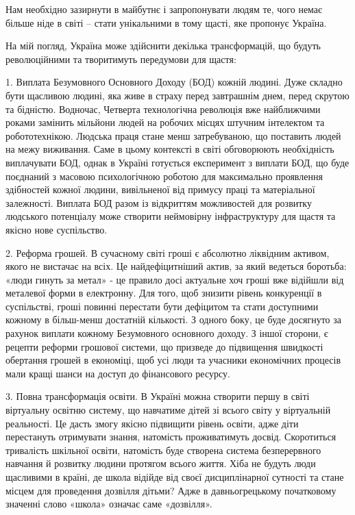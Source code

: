 Нам необхідно зазирнути в майбутнє і запропонувати людям те, чого немає більше
ніде в світі – стати унікальними в тому щасті, яке пропонує Україна. 

На мій погляд, Україна може здійснити декілька трансформацій, що будуть
революційними та творитимуть передумови для щастя:

1. Виплата Безумовного Основного Доходу (БОД) кожній людині. Дуже складно бути
щасливою людині, яка живе в страху перед завтрашнім днем, перед скрутою та
бідністю. Водночас, Четверта технологічна революція вже найближчими роками
замінить мільйони людей на робочих місцях штучним інтелектом та робототехнікою.
Людська праця стане менш затребуваною, що поставить людей на межу виживання.
Саме в цьому контексті в світі обговорюють необхідність виплачувати БОД, однак
в Україні готується експеримент з виплати БОД, що буде поєднаний з масовою
психологічною роботою для максимально проявлення здібностей кожної людини,
вивільненої від примусу праці та матеріальної залежності. Виплата БОД разом із
відкриттям можливостей для розвитку людського потенціалу може створити
неймовірну інфраструктуру для щастя та якісно нове суспільство. 

2. Реформа грошей. В сучасному світі гроші є абсолютно ліквідним активом, якого
не вистачає на всіх. Це найдефіцитніший актив, за який ведеться боротьба: «люди
гинуть за метал» - це правило досі актуальне хоч гроші вже відійшли від
металевої форми в електронну. Для того, щоб знизити рівень конкуренції в
суспільстві, гроші повинні перестати бути дефіцитом та стати доступними кожному
в більш-менш достатній кількості. З одного боку, це буде досягнуто за рахунок
виплати кожному Безумовного основного доходу. З іншої сторони, є рецепти
реформи грошової системи, що призведе до підвищення швидкості обертання грошей
в економіці, щоб усі люди та учасники економічних процесів мали кращі шанси на
доступ до фінансового ресурсу. 

3. Повна трансформація освіти. В Україні можна створити першу в світі
віртуальну освітню систему, що навчатиме дітей зі всього світу у віртуальній
реальності. Це дасть змогу якісно підвищити рівень освіти, адже діти
перестануть отримувати знання, натомість проживатимуть досвід. Скоротиться
тривалість шкільної освіти, натомість буде створена система безперервного
навчання й розвитку людини протягом всього життя. Хіба не будуть люди щасливими
в країні, де школа відійде від своєї дисциплінарної сутності та стане місцем
для проведення дозвілля дітьми? Адже в давньогрецькому початковому значенні
слово «школа» означає саме «дозвілля». 

